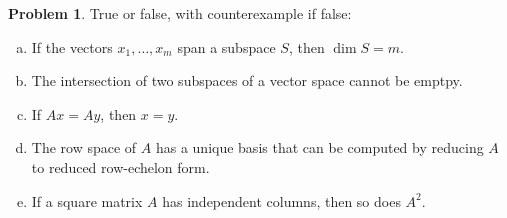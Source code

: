 \documentclass[10pt]{article}
\theoremstyle{definition}
\newtheorem{problem}[theorem]{Problem}
\newcommand{\1}[1]{\textbf{1}_{\left[#1\right]}} %
\begin{document}
\begin{problem}
  True or false, with counterexample if false:
  \begin{enumerate}[(a)]
    \item If the vectors $x_{1},\ldots,x_{m}$ span a subspace $S$, then $\dim
    S =m.$
    \item The intersection of two subspaces of a vector space cannot be
    emptpy.
    \item If $Ax=Ay$, then $x=y$.
    \item The row space of $A$ has a unique basis that can be computed by
    reducing $A$ to reduced row-echelon form.
    \item If a square matrix $A$ has independent columns, then so does $A^{2}$.
  \end{enumerate}
\end{problem}
\end{document}
